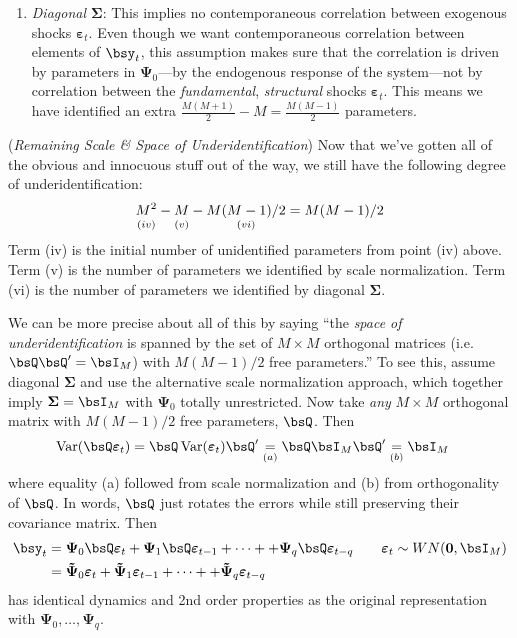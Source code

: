 \documentclass[12pt]{article}
\theoremstyle{plain}
\theoremstyle{definition}
\theoremstyle{remark}
\newcommand{\bsSigma}{\boldsymbol{\Sigma}}
\newcommand{\bsvarepsilon}{\boldsymbol{\varepsilon}}
\newcommand{\bsPsi}{\boldsymbol{\Psi}}
\newcommand{\bstildePsi}{\boldsymbol{\tilde{\Psi}}}
\renewcommand{\bso}{\boldsymbol{0}}
\newcommand{\Var}{\operatorname{Var}}
\begin{document}
\begin{enumerate}[label=(\roman*)]
  \item \emph{Diagonal $\bsSigma$}: This implies no contemporaneous
    correlation between exogenous shocks $\bsvarepsilon_t$. Even though
    we want contemporaneous correlation between elements of $\bsy_t$,
    this assumption makes sure that the correlation is driven by
    parameters in $\bsPsi_0$---by the endogenous response of
    the system---not by correlation between the \emph{fundamental},
    \emph{structural} shocks $\bsvarepsilon_t$.
    This means we have identified an extra $\frac{M(M+1)}{2} -
    M = \frac{M(M-1)}{2}$ parameters.
\end{enumerate}
(\emph{Remaining Scale \& Space of Underidentification})
Now that we've gotten all of the obvious and innocuous stuff out of the
way, we still have the following degree of underidentification:
\begin{align*}
  \underset{(iv)}{M^2\vphantom{M(M-1)/2}} -
  \underset{(v)}{M\vphantom{M(M-1)/2}}
  - \underset{(vi)}{M(M-1)/2}
  = M(M-1)/2
\end{align*}
Term (iv) is the initial number of unidentified parameters from point
(iv) above. Term (v) is the number of parameters we identified by scale
normalization. Term (vi) is the number of parameters we identified by
diagonal $\bsSigma$.

We can be more precise about all of this by saying ``the
\emph{space of underidentification} is spanned by the set of $M\times M$
orthogonal matrices (i.e. $\bsQ\bsQ'=\bsI_M$) with $M(M-1)/2$ free
parameters.'' To see this, assume diagonal $\bsSigma$ and use the
alternative scale normalization approach, which together imply
$\bsSigma=\bsI_M$ with $\bsPsi_0$ totally unrestricted.  Now take
\emph{any} $M\times M$ orthogonal matrix with $M(M-1)/2$ free
parameters, $\bsQ$. Then
\begin{align*}
  \Var(\bsQ\bsvarepsilon_t)
  &= \bsQ\Var(\bsvarepsilon_t)\bsQ'
  \underset{(a)}{=} \bsQ\bsI_M\bsQ'
  \underset{(b)}{=} \bsI_M
\end{align*}
where equality (a) followed from scale normalization and (b) from
orthogonality of $\bsQ$. In words, $\bsQ$ just rotates the errors while
still preserving their covariance matrix. Then
\begin{align*}
  \bsy_t
  &=
  \bsPsi_0\bsQ \bsvarepsilon_t
  + \bsPsi_1\bsQ \bsvarepsilon_{t-1}
  + \cdots +
  + \bsPsi_q\bsQ \bsvarepsilon_{t-q}
  \qquad \bsvarepsilon_t\sim WN(\bso,\bsI_M)
  \\
  &=
  \bstildePsi_0 \bsvarepsilon_t
  + \bstildePsi_1 \bsvarepsilon_{t-1}
  + \cdots +
  + \bstildePsi_q \bsvarepsilon_{t-q}
\end{align*}
has identical dynamics and 2nd order properties as the original
representation with $\bsPsi_0,\ldots,\bsPsi_q$.
\end{document}
